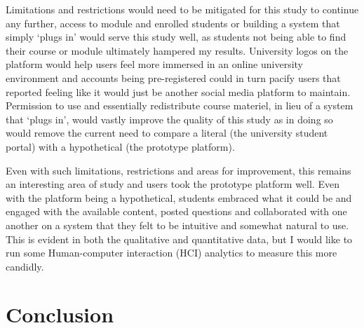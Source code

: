 \documentclass[lettersize,journal]{IEEEtran}
\begin{document}
	Limitations and restrictions would need to be mitigated for this study to continue any further, access to module and enrolled students or building a system that simply
	`plugs in' would serve this study well, as students not being able to find their course or module ultimately hampered my results. University logos on the platform  would help 
	users feel more immersed in an online university environment and accounts being pre-registered could in turn pacify users that reported feeling like it would just be another social media
	platform to maintain. Permission to use and essentially redistribute course materiel, in lieu of a system that `plugs in', would vastly improve the quality of this study as in doing so would
	remove the current need to compare a literal (the university student portal) with a hypothetical (the prototype platform).

	Even with such limitations, restrictions and areas for improvement,
	this remains an interesting area of study and users took the prototype platform well. Even with the platform being a hypothetical, students embraced what it could be and engaged with the
	available content, posted questions and collaborated with one another on a system that they felt to be intuitive and somewhat natural to use. This is evident in both the qualitative and
	quantitative data, but I would like to run some Human-computer interaction (HCI) analytics to measure this more candidly.


\section{Conclusion}
\end{document}
